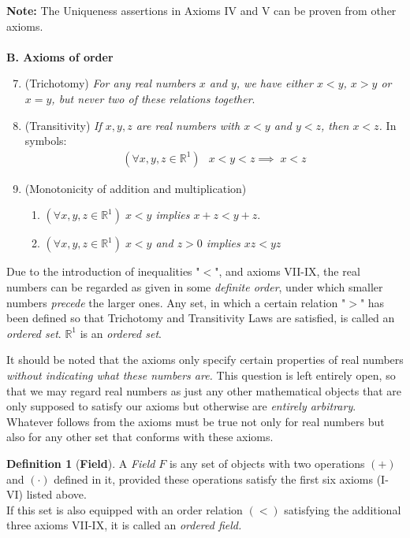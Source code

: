 \documentclass[12pt]{book}
\theoremstyle{definition}
\newtheorem{definition}{Definition}[section]
\begin{document}
\textbf{Note:} The Uniqueness assertions in Axioms IV and V can be proven from other axioms.
\\
\\
\textbf{B. Axioms of order}
\begin{enumerate}[label=\textbf{\Roman*}]
	\setcounter{enumi}{6}
	\item (Trichotomy) \textit{For any real numbers $x$ and $y$, we have either $x<y$, $x> y$ or $x =y$, but never two of these relations together}.
	\item (Transitivity) \textit{If $x,y, z$ are real numbers with $x <y$ and $y<z$, then $x<z$.} In symbols:
		\begin{align*}
			(\forall x,y,z \in \mathbb{R}^1) \;\:\: x<y<z \implies \; x<z 
		\end{align*}
	\item (Monotonicity of addition and multiplication)
	\begin{enumerate}
		\item \textit{$(\forall x,y,z \in \mathbb{R}^1) \; x< y$ implies $x+z<y+z$}.
		\item \textit{$(\forall x,y,z \in \mathbb{R}^1) \; x<y$ and $z>0$ implies $xz <yz$}
	\end{enumerate}
\end{enumerate}

\noindent 
Due to the introduction of inequalities "$<$", and axioms VII-IX, the real numbers can be regarded as given in some \textit{definite order}, under which smaller numbers \textit{precede} the larger ones. Any set, in which a certain relation "$>$" has been defined so that Trichotomy and Transitivity Laws are satisfied, is called an \textit{ordered set}. $\mathbb{R}^1$ is an \textit{ordered set}.

It should be noted that the axioms only specify certain properties of real numbers \textit{without indicating what these numbers are.} This question is left entirely open, so that we may regard real numbers as just any other mathematical objects that are only supposed to satisfy our axioms but otherwise are \textit{entirely arbitrary}. Whatever follows from the axioms must be true not only for real numbers but also for any other set that conforms with these axioms.     

\begin{definition}[\textbf{Field}]
A \textit{Field} $F$ is any set of objects with two operations $(+)$ and $(\cdot)$ defined in it, provided these operations satisfy the first six axioms (I-VI) listed above. \\
If this set is also equipped with an order relation $(<)$ satisfying the additional three axioms VII-IX, it is called an \textit{ordered field.} 
\end{definition}
\end{document}
